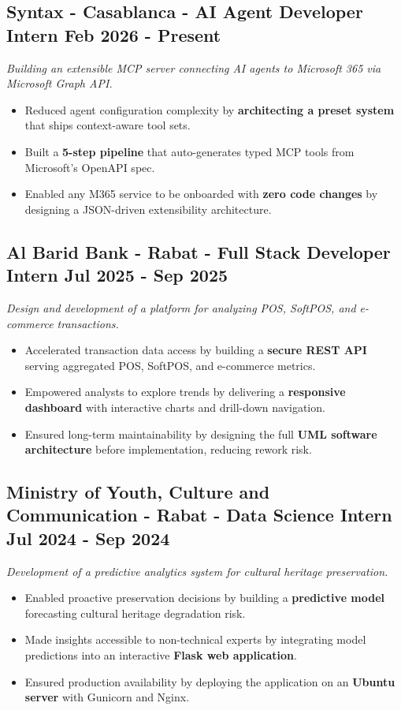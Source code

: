 \documentclass[10pt, letterpaper]{article}
\newenvironment{highlights}{
    \begin{itemize}[
        topsep=0.05cm,
        partopsep=0pt,
        itemsep=0.05cm,
        parsep=0pt,
        leftmargin=0.5cm
    ]
}{
    \end{itemize}
}
\begin{document}
\subsection{Syntax - Casablanca - AI Agent Developer Intern \hfill Feb 2026 - Present}
\textit{Building an extensible MCP server connecting AI agents to Microsoft 365 via Microsoft Graph API.}
\begin{highlights}
	\item Reduced agent configuration complexity by \textbf{architecting a preset system} that ships context-aware tool sets.
	\item Built a \textbf{5-step pipeline} that auto-generates typed MCP tools from Microsoft's OpenAPI spec.
	\item Enabled any M365 service to be onboarded with \textbf{zero code changes} by designing a JSON-driven extensibility architecture.
\end{highlights}

\subsection{Al Barid Bank - Rabat - Full Stack Developer Intern \hfill Jul 2025 - Sep 2025}
\textit{Design and development of a platform for analyzing POS, SoftPOS, and e-commerce transactions.}
\begin{highlights}
	\item Accelerated transaction data access by building a \textbf{secure REST API} serving aggregated POS, SoftPOS, and e-commerce metrics.
	\item Empowered analysts to explore trends by delivering a \textbf{responsive dashboard} with interactive charts and drill-down navigation.
	\item Ensured long-term maintainability by designing the full \textbf{UML software architecture} before implementation, reducing rework risk.
\end{highlights}

\subsection{Ministry of Youth, Culture and Communication - Rabat - Data Science Intern \hfill Jul 2024 - Sep 2024}
\textit{Development of a predictive analytics system for cultural heritage preservation.}
\begin{highlights}
	\item Enabled proactive preservation decisions by building a \textbf{predictive model} forecasting cultural heritage degradation risk.
	\item Made insights accessible to non-technical experts by integrating model predictions into an interactive \textbf{Flask web application}.
	\item Ensured production availability by deploying the application on an \textbf{Ubuntu server} with Gunicorn and Nginx.
\end{highlights}
\end{document}
